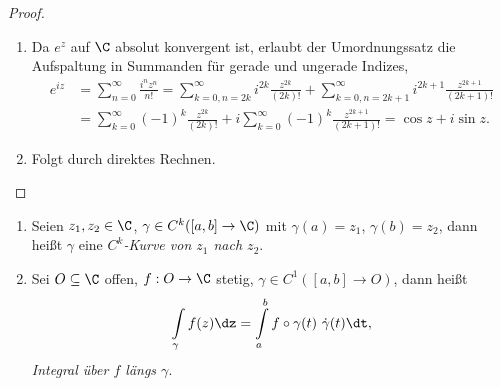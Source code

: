 \begin{proof}
\begin{enumerate}
\item
Da $e^z$ auf $\C$ absolut konvergent ist, erlaubt der Umordnungssatz die
Aufspaltung in Summanden für gerade und ungerade Indizes,
\begin{align*}
e^{iz} &= \sum\limits_{n=0}^\infty \frac{i^nz^n}{n!} = 
\sum\limits_{k=0,n=2k}^\infty i^{2k}\frac{z^{2k}}{(2k)!}
+\sum\limits_{k=0,n=2k+1}^\infty i^{2k+1}\frac{z^{2k+1}}{(2k+1)!}\\
&=\sum\limits_{k=0}^\infty (-1)^k \frac{z^{2k}}{(2k)!} +
i\sum\limits_{k=0}^\infty (-1)^k \frac{z^{2k+1}}{(2k+1)!} = \cos z + i\sin z.
\end{align*}
\item
Folgt durch direktes Rechnen.\qedhere  
\end{enumerate}
\end{proof}

\begin{defn}
\label{defn:2.11}
\begin{enumerate}
  \item Seien $z_1,z_2\in\C$, $\gamma\in C^k([a,b] \to \C)$ mit $\gamma(a) =
  z_1$, $\gamma(b) = z_2$, dann heißt $\gamma$ eine \emph{$C^k$-Kurve von $z_1$
  nach $z_2$}.
  \item Sei $O\subseteq \C$ offen, $f: O\to\C$ stetig, $\gamma\in
  C^1([a,b]\to O)$, dann heißt
  \begin{align*}
  \int\limits_{\gamma} f(z)\dz = \int\limits_a^b
  f\circ\gamma(t)\ \dot{\gamma}(t)\dt,
  \end{align*}
\emph{Integral über $f$ längs $\gamma$}.\fishhere
\end{enumerate}
\end{defn}

